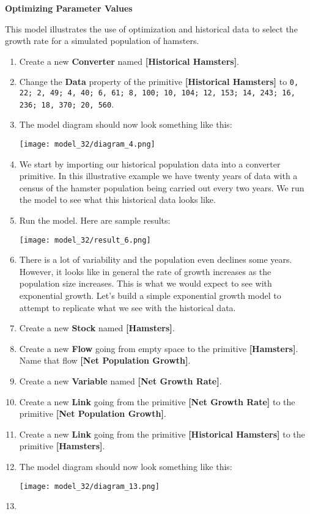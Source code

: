 \documentclass[]{memoir}
\makeatletter
\def\maxwidth{\ifdim\Gin@nat@width>\linewidth\linewidth
\else\Gin@nat@width\fi}
\let\Oldincludegraphics\includegraphics
\renewcommand{\includegraphics}[1]{\Oldincludegraphics[width=\maxwidth]{#1}}
\newcommand{\p}[1]{\textbf{{[}#1{]}}}
\newcommand{\e}[1]{\texttt{#1}}
\renewcommand{\a}[1]{\textbf{#1}}
\makeatother
\begin{document}
\FloatBarrier 

\begin{oframed}\textbf{Optimizing Parameter Values} 

 This model illustrates the use of optimization and historical data to select the growth rate for a simulated population of hamsters.

\begin{enumerate}
\item Create a new \a{Converter} named \p{Historical Hamsters}.
\item  Change the \a{Data} property of the primitive \p{Historical Hamsters} to \e{0, 22; 2, 49; 4, 40; 6, 61; 8, 100; 10, 104; 12, 153; 14, 243; 16, 236; 18, 370; 20, 560}.
\item The model diagram should now look something like this: \par \begin{minipage}{\linewidth}  \centering \texttt{[image: model\_32/diagram\_4.png]}
\end{minipage}
\item 

We start by importing our historical population data into a converter primitive. In this illustrative example we have twenty years of data with a census of the hamster population being carried out every two years. We run the model to see what this historical data looks like.


\item Run the model. Here are sample results:\par \begin{minipage}{\linewidth}  \centering \texttt{[image: model\_32/result\_6.png]}
\end{minipage}
\item 

There is a lot of variability and the population even declines some years. However, it looks like in general the rate of growth increases as the population size increases. This is what we would expect to see with exponential growth. Let's build a simple exponential growth model to attempt to replicate what we see with the historical data.


\item Create a new \a{Stock} named \p{Hamsters}.
\item Create a new \a{Flow} going from empty space to the primitive \p{Hamsters}. Name that flow \p{Net Population Growth}.
\item Create a new \a{Variable} named \p{Net Growth Rate}.
\item Create a new \a{Link} going from the primitive \p{Net Growth Rate} to the primitive \p{Net Population Growth}.
\item Create a new \a{Link} going from the primitive \p{Historical Hamsters} to the primitive \p{Hamsters}.
\item The model diagram should now look something like this: \par \begin{minipage}{\linewidth}  \centering \texttt{[image: model\_32/diagram\_13.png]}
\end{minipage}
\item 


\end{enumerate}
\end{oframed}
\end{document}
